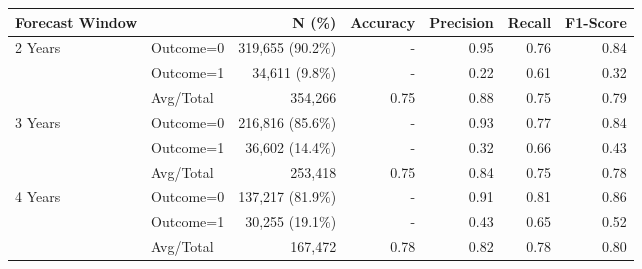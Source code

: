 \begin{tabular}{llrrrrr} \toprule
Forecast Window  & & N (\%)    & Accuracy & Precision   & Recall & F1-Score \\ \midrule
2 Years & Outcome=0 & 319,655 (90.2\%) & - & 0.95 & 0.76 & 0.84 \\
        & Outcome=1 & 34,611 (9.8\%) & - & 0.22 & 0.61 & 0.32 \\
        & Avg/Total & 354,266 & 0.75 & 0.88 & 0.75 & 0.79 \\
3 Years & Outcome=0 & 216,816 (85.6\%) & - & 0.93 & 0.77 & 0.84 \\
        & Outcome=1 & 36,602 (14.4\%) & - & 0.32 & 0.66 & 0.43 \\
        & Avg/Total & 253,418 & 0.75 & 0.84 & 0.75 & 0.78 \\
4 Years & Outcome=0 & 137,217 (81.9\%) & - & 0.91 & 0.81 & 0.86 \\
        & Outcome=1 & 30,255 (19.1\%) & - & 0.43 & 0.65 & 0.52 \\
        & Avg/Total & 167,472 & 0.78 & 0.82 & 0.78 & 0.80 \\
\bottomrule \end{tabular}
